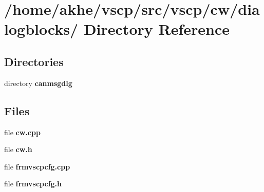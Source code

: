 \section{/home/akhe/vscp/src/vscp/cw/dialogblocks/ Directory Reference}
\label{dir_54ac66550fdd41e1b840c9127ddc5a8e}
\subsection*{Directories}
\begin{CompactItemize}
\item 
directory {\bf canmsgdlg}
\end{CompactItemize}
\subsection*{Files}
\begin{CompactItemize}
\item 
file \textbf{cw.cpp}
\item 
file \textbf{cw.h}
\item 
file \textbf{frmvscpcfg.cpp}
\item 
file \textbf{frmvscpcfg.h}
\end{CompactItemize}
